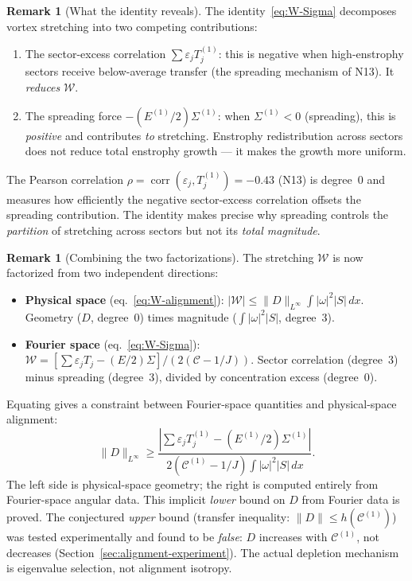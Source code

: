 \documentclass[11pt]{article}
\theoremstyle{definition}
\newtheorem{remark}[theorem]{Remark}
\newcommand{\cC}{\mathcal{C}}
\DeclareMathOperator{\corr}{corr}
\begin{document}
\begin{remark}[What the identity reveals]
\label{rem:W-Sigma}
The identity~\eqref{eq:W-Sigma} decomposes vortex
stretching into two competing contributions:
\begin{enumerate}[leftmargin=2em,label=\textup{(\roman*)}]
\item The sector-excess correlation
  $\sum\varepsilon_j T_j^{(1)}$: this is negative
  when high-enstrophy sectors receive below-average
  transfer (the spreading mechanism of N13).  It
  \emph{reduces} $\mathcal{W}$.
\item The spreading force $-(E^{(1)}/2)\Sigma^{(1)}$:
  when $\Sigma^{(1)}<0$ (spreading), this is
  \emph{positive} and contributes \emph{to}
  stretching.  Enstrophy redistribution across sectors
  does not reduce total enstrophy growth --- it
  makes the growth more uniform.
\end{enumerate}
The Pearson correlation $\rho=\corr(\varepsilon_j,
T_j^{(1)})=-0.43$ (N13) is degree~0 and measures
how efficiently the negative sector-excess
correlation offsets the spreading contribution.
The identity makes precise why spreading controls
the \emph{partition} of stretching across sectors
but not its \emph{total magnitude}.
\end{remark}

\begin{remark}[Combining the two factorizations]
\label{rem:two-factorizations}
The stretching $\mathcal{W}$ is now factorized
from two independent directions:
\begin{itemize}[leftmargin=2em]
\item \textbf{Physical space} (eq.~\eqref{eq:W-alignment}):
  $|\mathcal{W}|\leq\|D\|_{L^\infty}\int|\omega|^2|S|\,dx$.
  Geometry ($D$, degree~0) times magnitude
  ($\int|\omega|^2|S|$, degree~3).
\item \textbf{Fourier space} (eq.~\eqref{eq:W-Sigma}):
  $\mathcal{W}=[\sum\varepsilon_j T_j
  -(E/2)\Sigma]/(2(\cC-1/J))$.
  Sector correlation (degree~3) minus spreading
  (degree~3), divided by concentration excess
  (degree~0).
\end{itemize}
Equating gives a constraint between Fourier-space
quantities and physical-space alignment:
\begin{equation}\label{eq:D-constraint}
\|D\|_{L^\infty} \geq
\frac{|\sum\varepsilon_j T_j^{(1)}
  -(E^{(1)}/2)\Sigma^{(1)}|}
{2(\cC^{(1)}-1/J)\int|\omega|^2|S|\,dx}.
\end{equation}
The left side is physical-space geometry; the right
is computed entirely from Fourier-space angular data.
This implicit \emph{lower} bound on $D$ from Fourier
data is proved.  The conjectured \emph{upper} bound
(transfer inequality: $\|D\|\leq h(\cC^{(1)})$)
was tested experimentally and found to be
\emph{false}: $D$ increases with $\cC^{(1)}$, not
decreases (Section~\ref{sec:alignment-experiment}).
The actual depletion mechanism is eigenvalue selection,
not alignment isotropy.
\end{remark}
\end{document}

